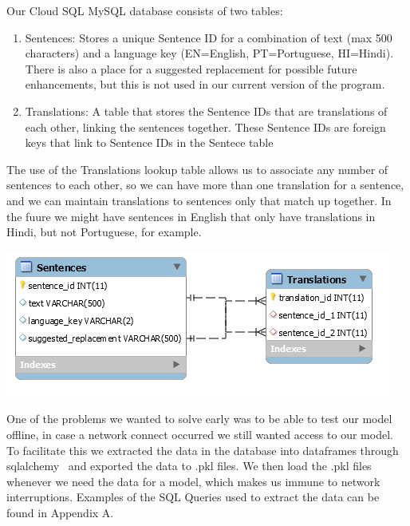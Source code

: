 \documentclass[runningheads]{llncs}
\begin{document}
	Our Cloud SQL MySQL database consists of two tables:
			
		\begin{enumerate}
			\item Sentences: Stores a unique Sentence ID for a combination of text (max 500 characters) and a language key (EN=English, PT=Portuguese, HI=Hindi). There is also a place for a suggested replacement for possible future enhancements, but this is not used in our current version of the program.
			\item Translations: A table that stores the Sentence IDs that are translations of each other, linking the sentences together. These Sentence IDs are foreign keys that link to Sentence IDs in the Sentece table
		\end{enumerate}

	The use of the Translations lookup table allows us to associate any number of sentences to each other, so we can have more than one translation for a sentence, and we can maintain translations to sentences only that match up together. In the fuure we might have sentences in English that only have translations in Hindi, but not Portuguese, for example. 	

	\begin{minipage}{\linewidth}
		\begin{center}
			\includegraphics[width=\linewidth]{Database_Diagram.png}
			\label{fig:Database Diagrams}
			\vspace*{1cm}
		\end{center}
	\end{minipage}
	\afterpage{\clearpage}

	One of the problems we wanted to solve early was to be able to test our model offline, in case a network connect occurred we still wanted access to our model. To facilitate this we extracted the data in the database into dataframes through sqlalchemy~\cite{ref_url15} and exported the data to .pkl files. We then load the .pkl files whenever we need the data for a model, which makes us immune to network interruptions. Examples of the SQL Queries used to extract the data can be found in Appendix A.
\end{document}
